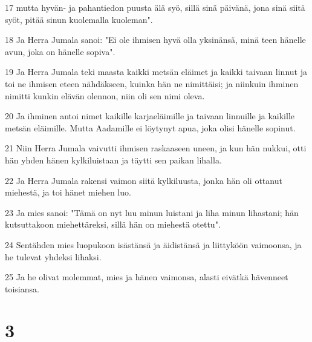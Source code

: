 \par 17 mutta hyvän- ja pahantiedon puusta älä syö, sillä sinä päivänä, jona sinä siitä syöt, pitää sinun kuolemalla kuoleman".
\par 18 Ja Herra Jumala sanoi: "Ei ole ihmisen hyvä olla yksinänsä, minä teen hänelle avun, joka on hänelle sopiva".
\par 19 Ja Herra Jumala teki maasta kaikki metsän eläimet ja kaikki taivaan linnut ja toi ne ihmisen eteen nähdäkseen, kuinka hän ne nimittäisi; ja niinkuin ihminen nimitti kunkin elävän olennon, niin oli sen nimi oleva.
\par 20 Ja ihminen antoi nimet kaikille karjaeläimille ja taivaan linnuille ja kaikille metsän eläimille. Mutta Aadamille ei löytynyt apua, joka olisi hänelle sopinut.
\par 21 Niin Herra Jumala vaivutti ihmisen raskaaseen uneen, ja kun hän nukkui, otti hän yhden hänen kylkiluistaan ja täytti sen paikan lihalla.
\par 22 Ja Herra Jumala rakensi vaimon siitä kylkiluusta, jonka hän oli ottanut miehestä, ja toi hänet miehen luo.
\par 23 Ja mies sanoi: "Tämä on nyt luu minun luistani ja liha minun lihastani; hän kutsuttakoon miehettäreksi, sillä hän on miehestä otettu".
\par 24 Sentähden mies luopukoon isästänsä ja äidistänsä ja liittyköön vaimoonsa, ja he tulevat yhdeksi lihaksi.
\par 25 Ja he olivat molemmat, mies ja hänen vaimonsa, alasti eivätkä hävenneet toisiansa.

\chapter{3}

